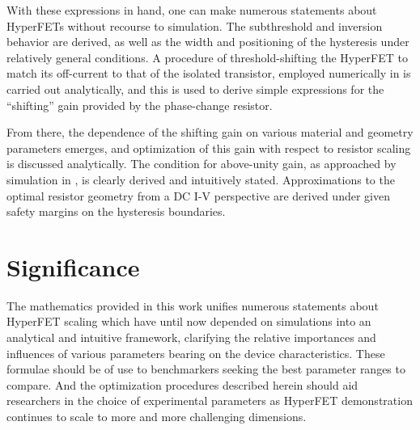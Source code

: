 \begin{multicols}{2}
With these expressions in hand, one can make numerous statements about HyperFETs without recourse to simulation.  The subthreshold and inversion behavior are derived, as well as the width and positioning of the hysteresis under relatively general conditions.  A procedure of threshold-shifting the HyperFET to match its off-current to that of the isolated transistor, employed numerically in \cite{Shukla_2015, Frougier_2016} is carried out analytically, and this is used to derive simple expressions for the ``shifting'' gain provided by the phase-change resistor. 

From there, the dependence of the shifting gain on various material and geometry parameters emerges, and optimization of this gain with respect to resistor scaling is discussed analytically.  The condition for above-unity gain, as approached by simulation in \cite{Frougier_2016}, is clearly derived and intuitively stated.  Approximations to the optimal resistor geometry from a DC I-V perspective are derived under given safety margins on the hysteresis boundaries.

\section*{Significance}
The mathematics provided in this work unifies numerous statements about HyperFET scaling which have until now depended on simulations into an analytical and intuitive framework, clarifying the relative importances and influences of various parameters bearing on the device characteristics.  These formulae should be of use to benchmarkers seeking the best parameter ranges to compare. And the optimization procedures described herein should aid researchers in the choice of experimental parameters as HyperFET demonstration continues to scale to more and more challenging dimensions.


\ifdoublecol\end{multicols}\fi

\vfill


